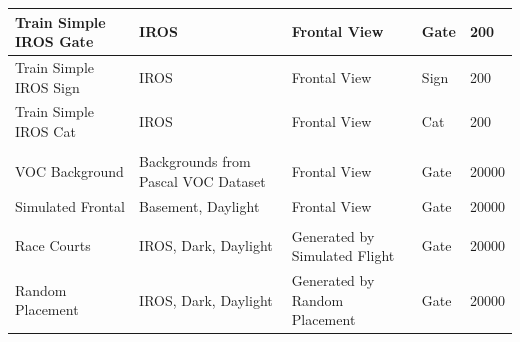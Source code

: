 \begin{table}[htbp]
\begin{tabular}{|l|p{2cm}|p{4cm}|p{2cm}|p{1cm}|}
		Train Simple IROS Gate & IROS & Frontal View & Gate & 200 \\ \hline
		Train Simple IROS Sign & IROS & Frontal View & Sign & 200 \\ \hline
		Train Simple IROS Cat & IROS & Frontal View & Cat & 200 \\ \hline
		&  &  &  & \multicolumn{1}{l|}{} \\ \hline
		VOC Background & Backgrounds from Pascal VOC Dataset & Frontal View & Gate & 20000 \\ \hline
		Simulated Frontal & Basement, Daylight & Frontal View & Gate & 20000 \\ \hline
		&  &  &  & \multicolumn{1}{l|}{} \\ \hline
		Race Courts & IROS, Dark, Daylight & Generated by Simulated Flight & Gate & 20000 \\ \hline
		Random Placement & IROS, Dark, Daylight & Generated by Random Placement & Gate & 20000 \\ \hline
	\end{tabular}
	\label{tab:datasets}
\end{table}




